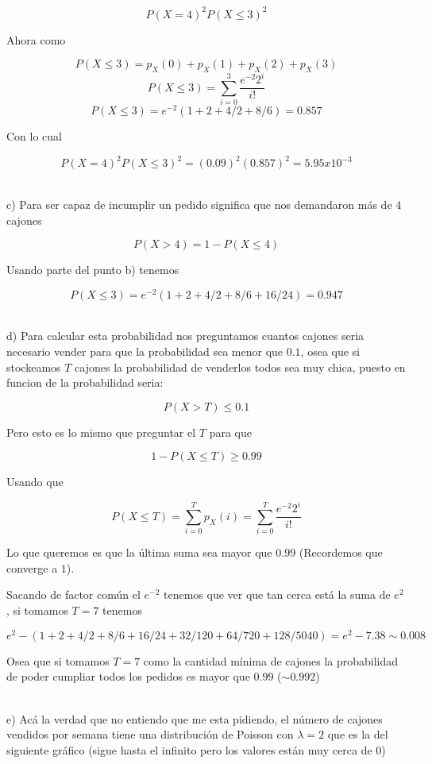 \documentclass[leqno, 12pt, twoside, letterpaper]{book}
\begin{document}
$$P(X = 4)^2 P(X \leq 3)^2$$

Ahora como

$$P(X \leq 3) = p_X(0) + p_X(1) + p_X(2) + p_X(3)$$
$$P(X \leq 3) = \sum_{i = 0}^{3} \dfrac{e^{-2} 2^i}{i!}$$
$$P(X \leq 3) =  e^{-2}(1 + 2 + 4/2 + 8/6) = 0.857$$

Con lo cual

$$P(X = 4)^2 P(X \leq 3)^2 = (0.09)^2 (0.857)^2 = 5.95 x 10^{-3}$$

\hfill\\
c) Para ser capaz de incumplir un pedido significa que nos demandaron más de 4
cajones

$$P(X > 4) = 1 - P(X \leq 4)$$

Usando parte del punto b) tenemos

$$P(X \leq 3) =  e^{-2}(1 + 2 + 4/2 + 8/6 + 16/24) = 0.947$$


\hfill\\
d) Para calcular esta probabilidad nos preguntamos cuantos cajones seria
necesario vender para que la probabilidad sea menor que $0.1$, osea que si
stockeamos $T$ cajones la probabilidad de venderlos todos sea muy chica, puesto
en funcion de la probabilidad seria:

$$P(X > T) \leq 0.1$$

Pero esto es lo mismo que preguntar el $T$ para que

$$1 - P(X \leq T) \geq 0.99$$

Usando que

$$P(X \leq T) = \sum_{i = 0}^{T} p_X(i) = \sum_{i = 0}^T \dfrac{e^{-2}
2^i}{i!}$$

Lo que queremos es que la última suma sea mayor que $0.99$ (Recordemos que
converge a $1$).

Sacando de factor común el $e^{-2}$ tenemos que ver que tan cerca está la suma
de $e^2$, si tomamos $T = 7$ tenemos

$$e^2 - (1 + 2 + 4/2 + 8/6 + 16/24 + 32/120 + 64/720 + 128/5040) = e^2 - 7.38
\sim 0.008$$

Osea que si tomamos $T = 7$ como la cantidad mínima de cajones la probabilidad
de poder cumpliar todos los pedidos es mayor que $0.99$ ($\sim 0.992$)

\hfill\\
e) Acá la verdad que no entiendo que me esta pidiendo, el número de cajones
vendidos por semana tiene una distribución de Poisson con $\lambda = 2$ que es
la del siguiente gráfico (sigue hasta el infinito pero los valores están muy
cerca de 0)

\begin{figure}[H]
    \centering
{}
\end{figure}
\end{document}
